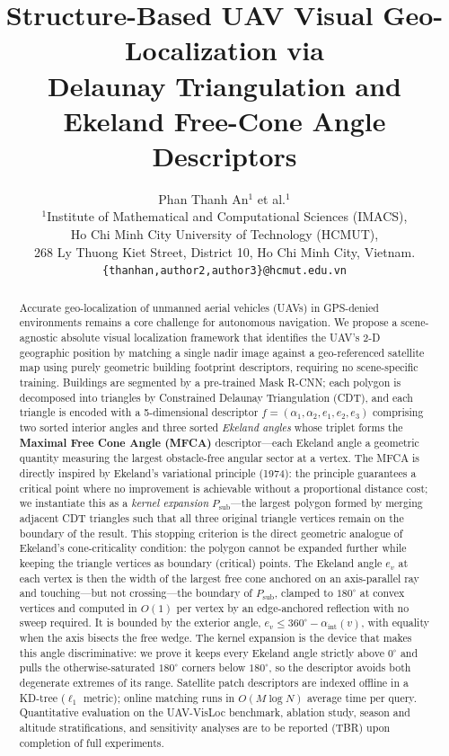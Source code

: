 \documentclass[10pt]{article}
\title{\textbf{Structure-Based UAV Visual Geo-Localization via\\
Delaunay Triangulation and Ekeland Free-Cone Angle Descriptors}}
\author{%
 Phan Thanh An$^{1}$ \quad et al.$^{1}$\\[4pt]
  $^{1}$Institute of Mathematical and Computational Sciences (IMACS), \\
  Ho Chi Minh City University of Technology (HCMUT), \\
  268 Ly Thuong Kiet Street, District 10, Ho Chi Minh City, Vietnam. \\[2pt]
  \texttt{\{thanhan,author2,author3\}@hcmut.edu.vn}
}
\date{}
\theoremstyle{plain}
\theoremstyle{definition}
\begin{document}
\maketitle

\begin{abstract}
Accurate geo-localization of unmanned aerial vehicles (UAVs) in GPS-denied
environments remains a core challenge for autonomous navigation.
We propose a scene-agnostic absolute visual localization framework that
identifies the UAV's 2-D geographic position by matching a single nadir image
against a geo-referenced satellite map using purely geometric building
footprint descriptors, requiring no scene-specific training.
Buildings are segmented by a pre-trained Mask R-CNN; each polygon is
decomposed into triangles by Constrained Delaunay Triangulation (CDT), and
each triangle is encoded with a 5-dimensional descriptor
$f = (\alpha_1,\alpha_2,e_1,e_2,e_3)$ comprising two sorted interior angles
and three sorted \emph{Ekeland angles} whose triplet forms the
\textbf{Maximal Free Cone Angle (MFCA)} descriptor---each Ekeland angle a
geometric quantity measuring the largest obstacle-free angular sector at a
vertex.
The MFCA is directly inspired by Ekeland's variational principle (1974):
the principle guarantees a critical point where no improvement is achievable
without a proportional distance cost; we instantiate this as a
\emph{kernel expansion} $P_{\mathrm{sub}}$---the largest polygon formed by
merging adjacent CDT triangles such that all three original triangle vertices
remain on the boundary of the result.
This stopping criterion is the direct geometric analogue of Ekeland's
cone-criticality condition: the polygon cannot be expanded further while
keeping the triangle vertices as boundary (critical) points.
The Ekeland angle $e_v$ at each vertex is then the width of the largest free
cone anchored on an axis-parallel ray and touching---but not crossing---the
boundary of $P_{\mathrm{sub}}$, clamped to $180^\circ$ at convex vertices and
computed in $O(1)$ per vertex by an edge-anchored reflection with no sweep
required. It is bounded by the exterior angle,
$e_v\le 360^\circ-\alpha_{\mathrm{int}}(v)$, with equality when the axis bisects
the free wedge.
The kernel expansion is the device that makes this angle discriminative: we
prove it keeps every Ekeland angle strictly above $0^\circ$ and pulls the
otherwise-saturated $180^\circ$ corners below $180^\circ$, so the descriptor
avoids both degenerate extremes of its range.
Satellite patch descriptors are indexed offline in a KD-tree ($\ell_1$ metric);
online matching runs in $O(M\log N)$ average time per query.
Quantitative evaluation on the UAV-VisLoc benchmark, ablation study, season
and altitude stratifications, and sensitivity analyses are to be reported
(TBR) upon completion of full experiments.
\end{abstract}
\end{document}
